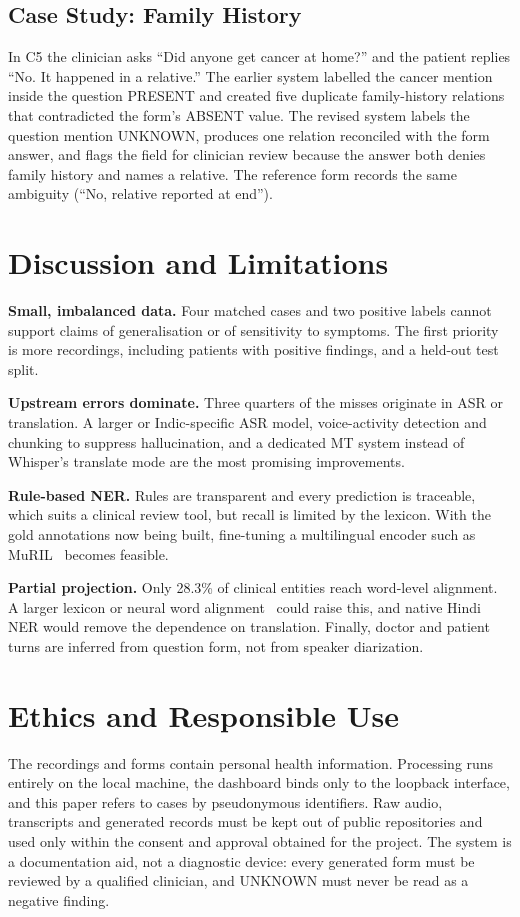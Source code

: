 \documentclass[conference]{IEEEtran}
\begin{document}
\subsection{Case Study: Family History}
In C5 the clinician asks “Did anyone get cancer at home?” and the patient replies “No. It happened in a relative.” The earlier system labelled the cancer mention inside the question PRESENT and created five duplicate family-history relations that contradicted the form's ABSENT value. The revised system labels the question mention UNKNOWN, produces one relation reconciled with the form answer, and flags the field for clinician review because the answer both denies family history and names a relative. The reference form records the same ambiguity (“No, relative reported at end”).

\section{Discussion and Limitations}
\textbf{Small, imbalanced data.} Four matched cases and two positive labels cannot support claims of generalisation or of sensitivity to symptoms. The first priority is more recordings, including patients with positive findings, and a held-out test split.

\textbf{Upstream errors dominate.} Three quarters of the misses originate in ASR or translation. A larger or Indic-specific ASR model, voice-activity detection and chunking to suppress hallucination, and a dedicated MT system instead of Whisper's translate mode are the most promising improvements.

\textbf{Rule-based NER.} Rules are transparent and every prediction is traceable, which suits a clinical review tool, but recall is limited by the lexicon. With the gold annotations now being built, fine-tuning a multilingual encoder such as MuRIL~\cite{muril} becomes feasible.

\textbf{Partial projection.} Only 28.3\% of clinical entities reach word-level alignment. A larger lexicon or neural word alignment~\cite{simalign} could raise this, and native Hindi NER would remove the dependence on translation. Finally, doctor and patient turns are inferred from question form, not from speaker diarization.

\section{Ethics and Responsible Use}
The recordings and forms contain personal health information. Processing runs entirely on the local machine, the dashboard binds only to the loopback interface, and this paper refers to cases by pseudonymous identifiers. Raw audio, transcripts and generated records must be kept out of public repositories and used only within the consent and approval obtained for the project. The system is a documentation aid, not a diagnostic device: every generated form must be reviewed by a qualified clinician, and UNKNOWN must never be read as a negative finding.
\end{document}
